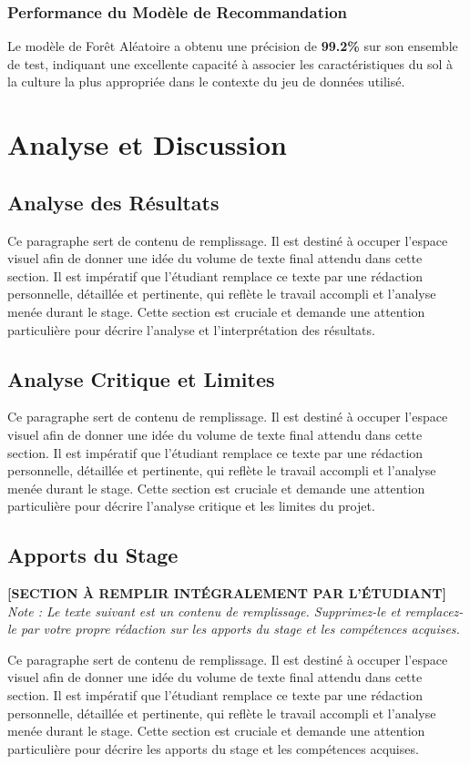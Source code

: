 \documentclass[12pt, a4paper]{report}
\begin{document}
\subsection{Performance du Modèle de Recommandation}
Le modèle de Forêt Aléatoire a obtenu une précision de \textbf{99.2\%} sur son ensemble de test, indiquant une excellente capacité à associer les caractéristiques du sol à la culture la plus appropriée dans le contexte du jeu de données utilisé.

\chapter{Analyse et Discussion}
\section{Analyse des Résultats}
Ce paragraphe sert de contenu de remplissage. Il est destiné à occuper l'espace visuel afin de donner une idée du volume de texte final attendu dans cette section. Il est impératif que l'étudiant remplace ce texte par une rédaction personnelle, détaillée et pertinente, qui reflète le travail accompli et l'analyse menée durant le stage. Cette section est cruciale et demande une attention particulière pour décrire l'analyse et l'interprétation des résultats.

\section{Analyse Critique et Limites}
Ce paragraphe sert de contenu de remplissage. Il est destiné à occuper l'espace visuel afin de donner une idée du volume de texte final attendu dans cette section. Il est impératif que l'étudiant remplace ce texte par une rédaction personnelle, détaillée et pertinente, qui reflète le travail accompli et l'analyse menée durant le stage. Cette section est cruciale et demande une attention particulière pour décrire l'analyse critique et les limites du projet.

\section{Apports du Stage}
\textbf{[SECTION À REMPLIR INTÉGRALEMENT PAR L'ÉTUDIANT]}
\newline
\textit{Note : Le texte suivant est un contenu de remplissage. Supprimez-le et remplacez-le par votre propre rédaction sur les apports du stage et les compétences acquises.}

Ce paragraphe sert de contenu de remplissage. Il est destiné à occuper l'espace visuel afin de donner une idée du volume de texte final attendu dans cette section. Il est impératif que l'étudiant remplace ce texte par une rédaction personnelle, détaillée et pertinente, qui reflète le travail accompli et l'analyse menée durant le stage. Cette section est cruciale et demande une attention particulière pour décrire les apports du stage et les compétences acquises.
\end{document}

